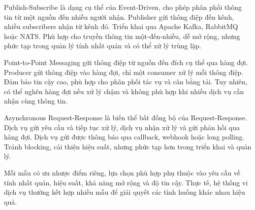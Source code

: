 Publish-Subscribe là dạng cụ thể của Event-Driven, cho phép phân phối thông tin từ một nguồn đến nhiều người nhận. Publisher gửi thông điệp đến kênh, nhiều subscribers nhận từ kênh đó. Triển khai qua Apache Kafka, RabbitMQ hoặc NATS. Phù hợp cho truyền thông tin một-đến-nhiều, dễ mở rộng, nhưng phức tạp trong quản lý tính nhất quán và có thể xử lý trùng lặp.

Point-to-Point Messaging gửi thông điệp từ nguồn đến đích cụ thể qua hàng đợi. Producer gửi thông điệp vào hàng đợi, chỉ một consumer xử lý mỗi thông điệp. Đảm bảo tin cậy cao, phù hợp cho phân phối tác vụ và cân bằng tải. Tuy nhiên, có thể nghẽn hàng đợi nếu xử lý chậm và không phù hợp khi nhiều dịch vụ cần nhận cùng thông tin.

Asynchronous Request-Response là biến thể bất đồng bộ của Request-Response. Dịch vụ gửi yêu cầu và tiếp tục xử lý, dịch vụ nhận xử lý và gửi phản hồi qua hàng đợi. Dịch vụ gửi được thông báo qua callback, webhook hoặc long polling. Tránh blocking, cải thiện hiệu suất, nhưng phức tạp hơn trong triển khai và quản lý.

Mỗi mẫu có ưu nhược điểm riêng, lựa chọn phù hợp phụ thuộc vào yêu cầu về tính nhất quán, hiệu suất, khả năng mở rộng và độ tin cậy. Thực tế, hệ thống vi dịch vụ thường kết hợp nhiều mẫu để giải quyết các tình huống khác nhau hiệu quả.